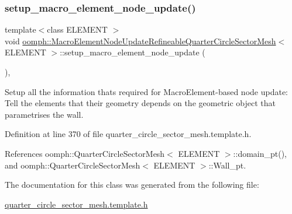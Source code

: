 \subsubsection{\texorpdfstring{setup\+\_\+macro\+\_\+element\+\_\+node\+\_\+update()}{setup\_macro\_element\_node\_update()}}
{\footnotesize\ttfamily template$<$class E\+L\+E\+M\+E\+NT $>$ \\
void \hyperlink{classoomph_1_1MacroElementNodeUpdateRefineableQuarterCircleSectorMesh}{oomph\+::\+Macro\+Element\+Node\+Update\+Refineable\+Quarter\+Circle\+Sector\+Mesh}$<$ E\+L\+E\+M\+E\+NT $>$\+::setup\+\_\+macro\+\_\+element\+\_\+node\+\_\+update (\begin{DoxyParamCaption}{ }\end{DoxyParamCaption})\hspace{0.3cm}{\ttfamily [inline]}, {\ttfamily [private]}}



Setup all the information that\textquotesingle{}s required for Macro\+Element-\/based node update\+: Tell the elements that their geometry depends on the geometric object that parametrises the wall. 



Definition at line 370 of file quarter\+\_\+circle\+\_\+sector\+\_\+mesh.\+template.\+h.



References oomph\+::\+Quarter\+Circle\+Sector\+Mesh$<$ E\+L\+E\+M\+E\+N\+T $>$\+::domain\+\_\+pt(), and oomph\+::\+Quarter\+Circle\+Sector\+Mesh$<$ E\+L\+E\+M\+E\+N\+T $>$\+::\+Wall\+\_\+pt.



The documentation for this class was generated from the following file\+:\begin{DoxyCompactItemize}
\item 
\hyperlink{quarter__circle__sector__mesh_8template_8h}{quarter\+\_\+circle\+\_\+sector\+\_\+mesh.\+template.\+h}\end{DoxyCompactItemize}
